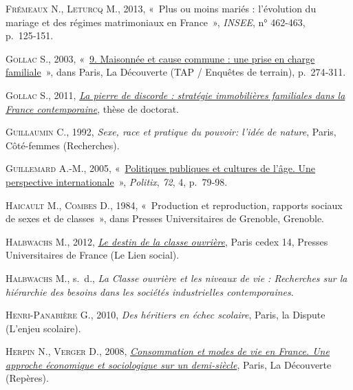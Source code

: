 \documentclass[
  12pt,
]{book}
\newlength{\cslhangindent}
\newenvironment{CSLReferences}[2] %
 {\begin{list}{}{%
  \setlength{\itemindent}{0pt}
  \setlength{\leftmargin}{0pt}
  \setlength{\parsep}{0pt}
  \ifodd #1
   \setlength{\leftmargin}{\cslhangindent}
   \setlength{\itemindent}{-1\cslhangindent}
  \fi
  \setlength{\itemsep}{#2\baselineskip}}}
 {\end{list}}
\begin{document}
\begin{CSLReferences}{0}{1}
\textsc{Frémeaux N.}, \textsc{Leturcq M.}, 2013, {«~Plus ou moins mariés
: l{'}évolution du mariage et des régimes matrimoniaux en France~»},
\emph{INSEE}, n° 462-463, p.~125‑151.

\textsc{Gollac S.}, 2003,
{«~\href{https://www.cairn.info/charges-de-famille--9782707141347-p-274.htm}{9.
Maisonnée et cause commune : une prise en charge familiale}~»}, dans
Paris, La Découverte (TAP / Enquêtes de terrain), p.~274‑311.

\textsc{Gollac S.}, 2011, \emph{\href{https://theses.fr/2011EHES0045}{La
pierre de discorde : stratégie immobilières familiales dans la France
contemporaine}}, thèse de doctorat.

\textsc{Guillaumin C.}, 1992, \emph{Sexe, race et pratique du pouvoir:
l'idée de nature}, Paris, Côté-femmes (Recherches).

\textsc{Guillemard A.-M.}, 2005,
{«~\href{https://doi.org/10.3917/pox.072.0079}{Politiques publiques et
cultures de l'âge. Une perspective internationale}~»}, \emph{Politix},
\emph{72}, 4, p.~79‑98.

\textsc{Haicault M.}, \textsc{Combes D.}, 1984, {«~Production et
reproduction, rapports sociaux de sexes et de classes~»}, dans Presses
Universitaires de Grenoble, Grenoble.

\textsc{Halbwachs M.}, 2012,
\emph{\href{https://www.cairn.info/le-destin-de-la-classe-ouvriere--9782130585909.htm}{Le
destin de la classe ouvrière}}, Paris cedex 14, Presses Universitaires
de France (Le Lien social).

\textsc{Halbwachs M.}, s.~d., \emph{La Classe ouvrière et les niveaux de
vie : Recherches sur la hiérarchie des besoins dans les sociétés
industrielles contemporaines}.

\textsc{Henri-Panabière G.}, 2010, \emph{Des héritiers en échec
scolaire}, Paris, la Dispute (L'enjeu scolaire).

\textsc{Herpin N.}, \textsc{Verger D.}, 2008,
\emph{\href{https://www.cairn.info/consommation-et-modes-de-vie-en-france--9782707156655.htm}{Consommation
et modes de vie en France. Une approche économique et sociologique sur
un demi-siècle}}, Paris, La Découverte (Repères).


\end{CSLReferences}
\end{document}
